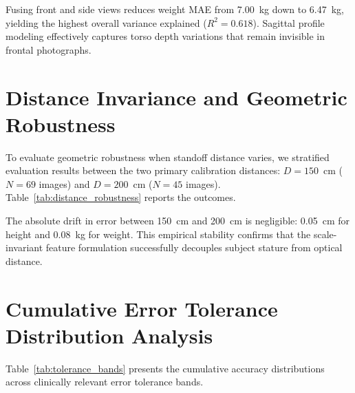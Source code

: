 \documentclass[12pt,a4paper,oneside]{report}
\begin{document}
Fusing front and side views reduces weight MAE from 7.00~kg down to 6.47~kg, yielding the highest overall variance explained ($R^2 = 0.618$). Sagittal profile modeling effectively captures torso depth variations that remain invisible in frontal photographs.

\section{Distance Invariance and Geometric Robustness}
To evaluate geometric robustness when standoff distance varies, we stratified evaluation results between the two primary calibration distances: $D = 150$~cm ($N = 69$ images) and $D = 200$~cm ($N = 45$ images). Table~\ref{tab:distance_robustness} reports the outcomes.

\begin{table}[H]
\centering
\caption{Stratified Standoff Distance Robustness Analysis ($150\text{ cm}$ vs $200\text{ cm}$)}
\label{tab:distance_robustness}
\end{table}

The absolute drift in error between 150~cm and 200~cm is negligible: 0.05~cm for height and 0.08~kg for weight. This empirical stability confirms that the scale-invariant feature formulation successfully decouples subject stature from optical distance.

\section{Cumulative Error Tolerance Distribution Analysis}
Table~\ref{tab:tolerance_bands} presents the cumulative accuracy distributions across clinically relevant error tolerance bands.
\end{document}
